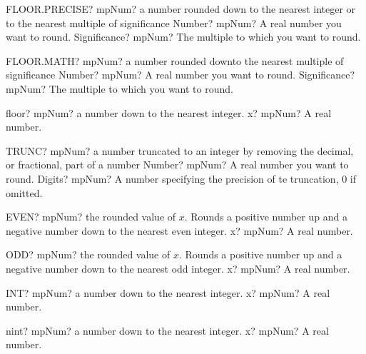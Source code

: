 \documentclass[12pt,a4paper,openany]{book}
\begin{document}
\begin{mpFunctionsExtract}
\mpWorksheetFunctionTwoNotImplemented
{FLOOR.PRECISE? mpNum? a number rounded down to the nearest integer or to the nearest multiple of significance}
{Number? mpNum? A real number you want to round.}
{Significance? mpNum? The multiple to which you want to round.}
\end{mpFunctionsExtract}

\begin{mpFunctionsExtract}
\mpWorksheetFunctionTwoNotImplemented
{FLOOR.MATH? mpNum? a number rounded downto the nearest multiple of significance}
{Number? mpNum? A real number you want to round.}
{Significance? mpNum? The multiple to which you want to round.}
\end{mpFunctionsExtract}

\begin{mpFunctionsExtract}
\mpFunctionOne
{floor? mpNum?  a number down to the nearest integer.}
{x? mpNum? A real number.}
\end{mpFunctionsExtract}

\begin{mpFunctionsExtract}
\mpWorksheetFunctionTwoNotImplemented
{TRUNC? mpNum? a number truncated to an integer by removing the decimal, or fractional, part of a number}
{Number? mpNum? A real number you want to round.}
{Digits? mpNum? A number specifying the precision of te truncation, 0 if omitted.}
\end{mpFunctionsExtract}

\begin{mpFunctionsExtract}
\mpWorksheetFunctionOneNotImplemented
{EVEN? mpNum? the rounded value of $x$. Rounds a positive number up and a negative number down to the nearest even integer.}
{x? mpNum? A real number.}
\end{mpFunctionsExtract}

\begin{mpFunctionsExtract}
\mpWorksheetFunctionOneNotImplemented
{ODD? mpNum? the rounded value of $x$. Rounds a positive number up and a negative number down to the nearest odd integer.}
{x? mpNum? A real number.}
\end{mpFunctionsExtract}

\begin{mpFunctionsExtract}
\mpWorksheetFunctionOneNotImplemented
{INT? mpNum?  a number down to the nearest integer.}
{x? mpNum? A real number.}
\end{mpFunctionsExtract}

\begin{mpFunctionsExtract}
\mpFunctionOne
{nint? mpNum?  a number down to the nearest integer.}
{x? mpNum? A real number.}
\end{mpFunctionsExtract}
\end{document}
